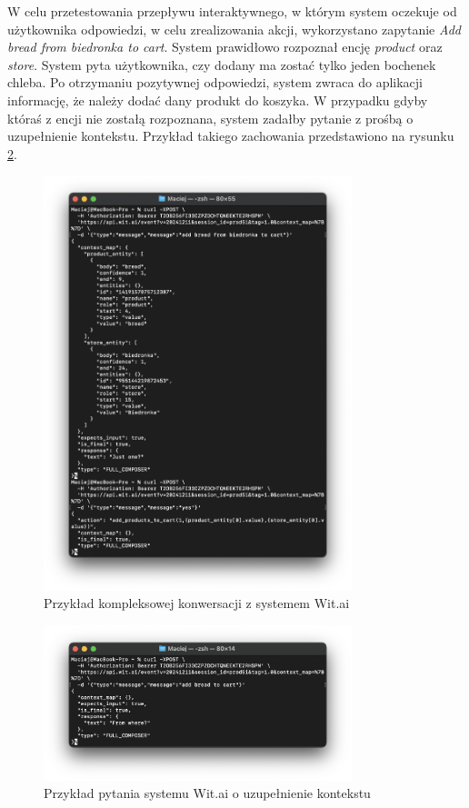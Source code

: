 W celu przetestowania przepływu interaktywnego, w którym system oczekuje od użytkownika odpowiedzi, w celu zrealizowania akcji, wykorzystano zapytanie \textit{Add bread from biedronka to cart}. System prawidłowo rozpoznał encję \textit{product} oraz \textit{store}. System pyta użytkownika, czy dodany ma zostać tylko jeden bochenek chleba. Po otrzymaniu pozytywnej odpowiedzi, system zwraca do aplikacji informację, że należy dodać dany produkt do koszyka. W przypadku gdyby któraś z encji nie zostałą rozpoznana, system zadałby pytanie z prośbą o uzupełnienie kontekstu. Przykład takiego zachowania przedstawiono na rysunku \ref{fig:witai_context_example}.
\begin{figure}[H]
    \centering
    \includegraphics[width=0.8\textwidth]{images/witai_complex_convo.png}
    \caption{Przykład kompleksowej konwersacji z systemem Wit.ai}
    \label{fig:witai_complex_convo}
\end{figure}

\begin{figure}[H]
    \centering
    \includegraphics[width=0.8\textwidth]{images/witai_context_example.png}
    \caption{Przykład pytania systemu Wit.ai o uzupełnienie kontekstu}
    \label{fig:witai_context_example}
\end{figure}

